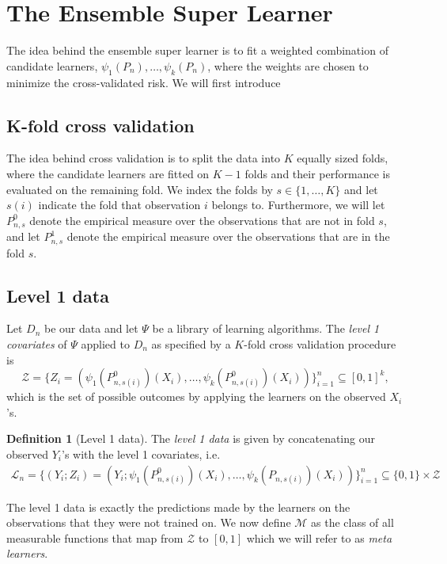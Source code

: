 \documentclass[11pt, a4paper]{article}
\theoremstyle{definition}
\newtheorem{definition}[theorem]{Definition}
\theoremstyle{remark}
\newcommand{\ml}{k}
\newcommand{\la}{\psi}
\newcommand{\lib}{\Psi}
\newcommand{\lone}{\mathcal{L}}
\begin{document}
\section{The Ensemble Super Learner}
The idea behind the ensemble super learner is to fit a weighted combination of candidate learners, $\la_1(P_{n}), \ldots, \la_k(P_{n}) $, where the weights are chosen to minimize the cross-validated risk. We will first introduce 

\subsection{K-fold cross validation}
The idea behind cross validation is to split the data into $ K $ equally sized folds, where the candidate learners are fitted on $ K - 1 $ folds and their performance is evaluated on the remaining fold. We index the folds by $ s \in \{1, \dots , K\} $ and let $ s(i) $ indicate the fold that observation $ i $ belongs to. Furthermore, we will let $ P_{n, s}^{0} $ denote the empirical measure over the observations that are not in fold $ s $, and let $ P_{n, s}^{1} $ denote the empirical measure over the observations that are in the fold $ s $.  

\subsection{Level 1 data}
Let $ D_n $ be our data and let $ \lib $ be a library of learning algorithms. The \textit{level 1 covariates} of $ \lib $ applied to $ D_n $ as specified by a $ K $-fold cross validation procedure is  
$$ \mathcal{Z} = \{Z_i = (\la_1(P_{n, s(i)}^{0})(X_i), \ldots, \la_\ml(P_{n, s(i)}^0)(X_i) ) \}_{i = 1}^{n} \subseteq [0,1]^{k}, $$
which is the set of possible outcomes by applying the learners on the observed $ X_i $'s. 

\begin{definition}[Level 1 data]
    The \textit{level 1 data} is given by concatenating our observed $ Y_i $'s with the level 1 covariates, i.e.
    \begin{align*}
        \lone_{n}  = \{(Y_i ; Z_i) = (Y_i; \la_1(P_{n, s(i)}^{0})(X_i), \ldots, \la_\ml(P_{n, s(i)})(X_i)) \}_{i = 1}^n \subseteq \{0,1\} \times \mathcal{Z}  
    \end{align*}
\end{definition}
The level 1 data is exactly the predictions made by the learners on the observations that they were not trained on.
We now define $ \mathcal{M} $ as the class of all measurable functions that map from $ \mathcal{Z} $ to $ [0,1] $ which we will refer to as \textit{meta learners}. 
\end{document}
